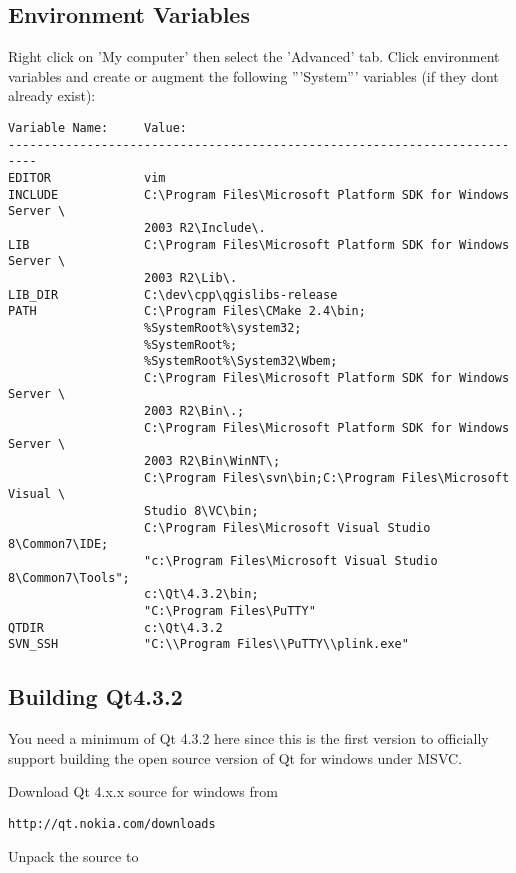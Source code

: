 \subsection{Environment Variables}
Right click on 'My computer' then select the 'Advanced' tab. Click environment variables and 
create or augment the following '''System''' variables (if they dont already exist):

\begin{verbatim}
Variable Name:     Value:
--------------------------------------------------------------------------
EDITOR             vim
INCLUDE            C:\Program Files\Microsoft Platform SDK for Windows Server \
                   2003 R2\Include\.
LIB                C:\Program Files\Microsoft Platform SDK for Windows Server \
                   2003 R2\Lib\.
LIB_DIR            C:\dev\cpp\qgislibs-release
PATH               C:\Program Files\CMake 2.4\bin;
                   %SystemRoot%\system32;
                   %SystemRoot%;
                   %SystemRoot%\System32\Wbem;
                   C:\Program Files\Microsoft Platform SDK for Windows Server \
                   2003 R2\Bin\.;
                   C:\Program Files\Microsoft Platform SDK for Windows Server \
                   2003 R2\Bin\WinNT\;
                   C:\Program Files\svn\bin;C:\Program Files\Microsoft Visual \
                   Studio 8\VC\bin;
                   C:\Program Files\Microsoft Visual Studio 8\Common7\IDE;
                   "c:\Program Files\Microsoft Visual Studio 8\Common7\Tools";
                   c:\Qt\4.3.2\bin;
                   "C:\Program Files\PuTTY"
QTDIR              c:\Qt\4.3.2
SVN_SSH            "C:\\Program Files\\PuTTY\\plink.exe"
\end{verbatim}

\subsection{Building Qt4.3.2}
You need a minimum of Qt 4.3.2 here since this is the first version to officially 
support building the open source version of Qt for windows under MSVC.

Download Qt 4.x.x source for windows from

\begin{verbatim}
http://qt.nokia.com/downloads
\end{verbatim}

Unpack the source to 

